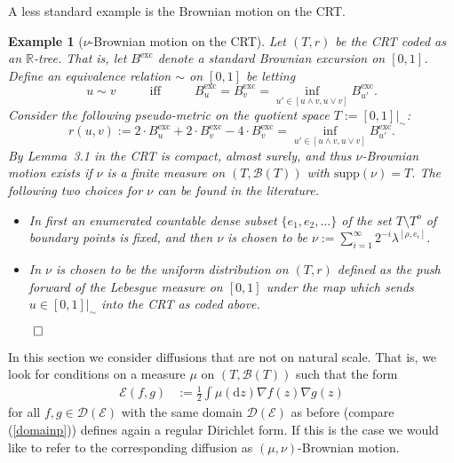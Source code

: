 \documentclass[11pt]{amsart}
\numberwithin{equation}{section}
\newtheorem{example}[definition]{Example}
\begin{document}
{A less standard example is the Brownian motion on the CRT.
\begin{example}[$\nu$-Brownian motion on the CRT]{\smallskip}
Let $(T,r)$ be the CRT coded as an ${{\mathbb R}}$-tree. That is, let $B^{\mathrm{exc}}$ denote a standard Brownian excursion on $[0,1]$. Define an equivalence relation $\sim$ on $[0,1]$
be letting \label{Exp:02}
\begin{equation}
\label{e:CRT1}
   u\sim v\hspace{1cm}\mbox{ iff }\hspace{1cm}B^{\mathrm{exc}}_{u}=B^{\mathrm{exc}}_v=\inf_{u'\in[u\wedge v,u\vee v]}B^{\mathrm{exc}}_{u'}.
\end{equation}
Consider the following pseudo-metric on the quotient space $T:=[0,1]\big|_\sim$:
\begin{equation}
\label{e:CRT2}
   r(u,v):=2\cdot B^{\mathrm{exc}}_{u}+2\cdot B^{\mathrm{exc}}_v-4\cdot B^{\mathrm{exc}}_v=\inf_{u'\in[u\wedge v,u\vee v]}B^{\mathrm{exc}}_{u'}.
\end{equation}
By Lemma~3.1 in \cite{EvaPitWin2006} the CRT is compact, almost surely,  and thus $\nu$-Brownian motion exists if $\nu$ is a finite measure on $(T,{\mathcal B}(T))$
with $\mathrm{supp}(\nu)=T$. The following two choices for $\nu$ can be found in the literature.
\begin{itemize}
\item In \cite{Kre95} first an enumerated countable dense subset $\{e_1,e_2,...\}$ of the set $T\setminus T^o$ of boundary points is fixed, and then $\nu$ is chosen to be $\nu:=\sum_{i=1}^\infty 2^{-i}\lambda^{[\rho,e_i]}$.
\item In \cite{Cro07,Cro08} $\nu$ is chosen to be the uniform distribution on $(T,r)$ defined as the push forward of the Lebesgue measure on $[0,1]$ under the map which sends $u\in [0,1]\big|_\sim$ into the CRT as coded above.
\end{itemize}\hfill$\qed$
\end{example}{\smallskip}

In this section we consider diffusions that are not on natural scale. That is, we look for conditions on a measure $\mu$ on $(T,{\mathcal B}(T))$ such that
the form
\begin{equation}
\label{con.2pmu}
\begin{aligned}
   {\mathcal E}(f,g)
 &:=
   \frac{1}{2}\int\mu(\mathrm{d}z)\nabla f(z)
   \nabla g(z)
\end{aligned}
\end{equation}
for all $f,g\in{\mathcal D}({\mathcal E})$ with the same domain ${\mathcal D}({\mathcal E})$ as before (compare (\ref{domainp}))
defines again a regular Dirichlet form. If this is the case we would like to refer to the corresponding diffusion as $(\mu,\nu)$-Brownian motion.

}
\end{document}
